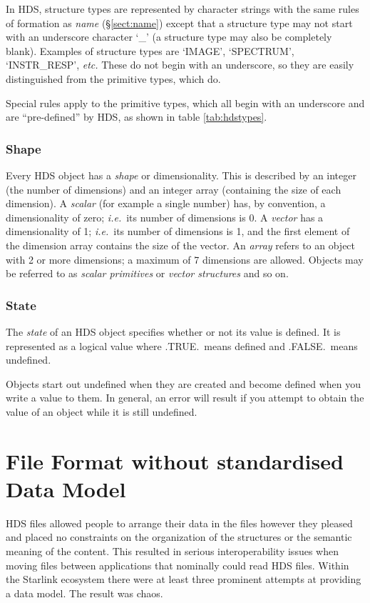 \documentclass[final,authoryear,5p,times,twocolumn]{elsarticle}
\begin{document}
In HDS, structure types are represented by character strings with the
same rules of formation as \emph{name} (\S\ref{sect:name}) except that
a structure type may not start with an underscore character `\_' (a
structure type may also be completely blank). Examples of structure
types are `IMAGE', `SPECTRUM', `INSTR\_RESP', \emph{etc.} These do not
begin with an underscore, so they are easily distinguished from the
primitive types, which do.

Special rules apply to the primitive types, which all begin with an
underscore and are ``pre-defined'' by HDS, as shown in table
\ref{tab:hdstypes}.

\subsubsection{\label{sect:shape}Shape}

Every HDS object has a \emph{shape} or dimensionality. This is
described by an integer (the number of dimensions) and an integer
array (containing the size of each dimension). A \emph{scalar} (for
example a single number) has, by convention, a dimensionality of zero;
\emph{i.e.}\ its number of dimensions is 0. A \emph{vector} has a
dimensionality of 1; \emph{i.e.}\ its number of dimensions is 1, and
the first element of the dimension array contains the size of the
vector.  An \emph{array} refers to an object with 2 or more dimensions;
a maximum of 7 dimensions are allowed. Objects may be referred to as
\emph{scalar primitives} or \emph{vector structures} and so on.

\subsubsection{State}

The \emph{state} of an HDS object specifies whether or not its value is
defined. It is represented as a logical value where .TRUE.\ means
defined and .FALSE.\ means undefined.

Objects start out undefined when they are created and become defined
when you write a value to them. In general, an error will result if
you attempt to obtain the value of an object while it is still
undefined.


\section{File Format without standardised Data Model}

HDS files allowed people to arrange their data in the files however
they pleased and placed no constraints on the organization of the
structures or the semantic meaning of the content. This resulted in
serious interoperability issues when moving files between applications
that nominally could read HDS files. Within the Starlink ecosystem
there were at least three prominent attempts at providing a data model.
The result was chaos.
\end{document}
